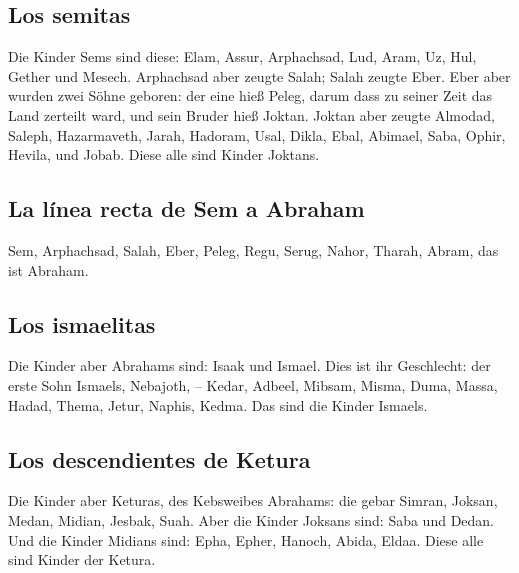 \hypertarget{los-semitas}{%
\subsection{Los semitas}\label{los-semitas}}

 Die Kinder Sems sind diese: Elam, Assur, Arphachsad,
Lud, Aram, Uz, Hul, Gether und Mesech.  Arphachsad aber
zeugte Salah; Salah zeugte Eber.  Eber aber wurden zwei
Söhne geboren: der eine hieß Peleg, darum dass zu seiner Zeit das Land
zerteilt ward, und sein Bruder hieß Joktan.  Joktan aber
zeugte Almodad, Saleph, Hazarmaveth, Jarah,  Hadoram,
Usal, Dikla,  Ebal, Abimael, Saba,  Ophir,
Hevila, und Jobab. Diese alle sind Kinder Joktans.

\hypertarget{la-luxednea-recta-de-sem-a-abraham}{%
\subsection{La línea recta de Sem a
Abraham}\label{la-luxednea-recta-de-sem-a-abraham}}

 Sem, Arphachsad, Salah,  Eber, Peleg,
Regu,  Serug, Nahor, Tharah,  Abram, das
ist Abraham.

\hypertarget{los-ismaelitas}{%
\subsection{Los ismaelitas}\label{los-ismaelitas}}

 Die Kinder aber Abrahams sind: Isaak und Ismael.
 Dies ist ihr Geschlecht: der erste Sohn Ismaels,
Nebajoth, -- Kedar, Adbeel, Mibsam,  Misma, Duma, Massa,
Hadad, Thema,  Jetur, Naphis, Kedma. Das sind die Kinder
Ismaels.

\hypertarget{los-descendientes-de-ketura}{%
\subsection{Los descendientes de
Ketura}\label{los-descendientes-de-ketura}}

 Die Kinder aber Keturas, des Kebsweibes Abrahams: die
gebar Simran, Joksan, Medan, Midian, Jesbak, Suah. Aber die Kinder
Joksans sind: Saba und Dedan.  Und die Kinder Midians
sind: Epha, Epher, Hanoch, Abida, Eldaa. Diese alle sind Kinder der
Ketura.

